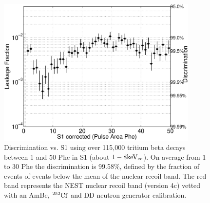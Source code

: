 \begin{figure}[h!]\centering
\includegraphics[width=100mm]{CH3T_Leakage_fid_50_Dec_Tritium_Approval_Plots_2.eps}
\caption{Discrimination vs. S1 using over 115,000 tritium beta decays between 1 and 50 Phe in S1 (about $\rm1-8 keV_{ee}$). On average from 1 to 30 Phe the discrimination is 99.58\%, defined by the fraction of events of events below the mean of the nuclear recoil band. The red band represents the NEST nuclear recoil band (version 4c) vetted with an AmBe, $\rm^{252}Cf$ and DD neutron generator calibration.}
\label{fig:Leak}
\end{figure}

